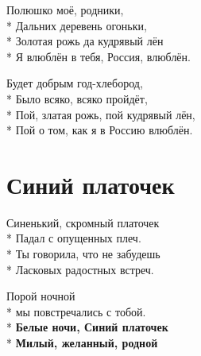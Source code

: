 \medskip

\begin{minipage}{\linewidth}
Полюшко моё, родники,\\*
Дальних деревень огоньки,\\*
Золотая рожь да кудрявый лён\\*
Я влюблён в тебя, Россия, влюблён.\\
\end{minipage}\par\medskip\nobreak

\medskip

\begin{minipage}{\linewidth}
Будет добрым год-хлебород,\\*
Было всяко, всяко пройдёт,\\*
Пой, златая рожь, пой кудрявый лён,\\*
Пой о том, как я в Россию влюблён.\\
\end{minipage}

\vspace{\fill}\newpage

\section{Синий платочек}
\label{song:Синий_платочек}

\medskip

\begin{minipage}{\linewidth}
Синенький, скромный платочек\\*
Падал с опущенных плеч.\\*
Ты говорила, что не забудешь\\*
Ласковых радостных встреч.\\
\end{minipage}\par\medskip\nobreak

\medskip

\begin{minipage}{\linewidth}
Порой ночной\\*
мы повстречались с тобой.\\*
\textbf{Белые ночи, Синий платочек}\\*
\textbf{Милый, желанный, родной}\\
\end{minipage}\par\medskip\nobreak

